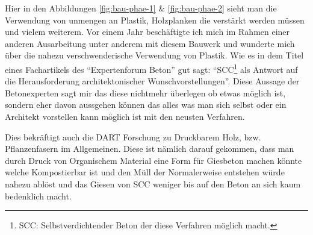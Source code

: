 \documentclass{article}
\begin{document}
    Hier in den Abbildungen \ref{fig:bau-phae-1} \& \ref{fig:bau-phae-2}
    sieht man die Verwendung von unmengen an Plastik, Holzplanken die verst\"arkt 
    werden m\"ussen und vielem weiterem. Vor einem Jahr besch\"aftigte ich mich im Rahmen
    einer anderen Ausarbeitung unter anderem mit diesem Bauwerk und wunderte mich 
    \"uber die nahezu verschwenderische Verwendung von Plastik. Wie es \parencite{mayer} in 
    dem Titel eines Fachartikels des ``Expertenforum Beton'' gut sagt:
    ``SCC\footnote{SCC: Selbstverdichtender Beton der diese Verfahren
    m\"oglich macht.} als Antwort auf die Herausforderung architektonischer
    Wunschvorstellungen''. Diese Aussage der Betonexperten sagt mir das
    diese nichtmehr \"uberlegen ob etwas m\"oglich ist, sondern eher davon
    aussgehen k\"onnen das alles was man sich selbst oder ein Architekt vorstellen
    kann m\"oglich ist mit den neusten Verfahren.

    Dies bekr\"aftigt auch die DART Forschung zu Druckbarem Holz, bzw.
    Pflanzenfasern im Allgemeinen. Diese ist n\"amlich darauf gekommen,
    dass man durch Druck von Organischem Material eine Form f\"ur Giesbeton
    machen k\"onnte welche Kompostierbar ist und den M\"ull der
    Normalerweise entstehen w\"urde nahezu abl\"ost und das Giesen von SCC
    weniger bis auf den Beton an sich kaum bedenklich macht.
\end{document}
